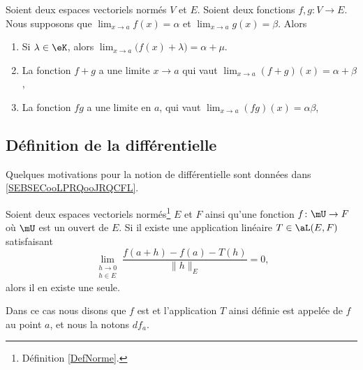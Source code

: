 \begin{proposition}     \label{PROPooBHHCooPbRggh}
	Soient deux espaces vectoriels normés \( V\) et \( E\). Soient deux fonctions \( f,g\colon V\to E\). Nous supposons que \( \lim_{x\to a} f(x)=\alpha\) et \( \lim_{x\to a} g(x)=\beta\). Alors
	\begin{enumerate}
		\item	\label{ITEMooDPBHooKRccPZ}
		      Si \( \lambda\in \eK\), alors \( \lim_{x\to a}\big( f(x)+\lambda \big)=\alpha+\mu\).
		\item   \label{ITEMooDKJPooMynOcG}
		      La fonction \( f+g\) a une limite \( x\to a\) qui vaut \( \lim_{x\to a} (f+g)(x)=\alpha+\beta\),
		\item
		      La fonction \( fg\) a une limite en \( a\), qui vaut \( \lim_{x\to a} (fg)(x)=\alpha\beta\),
	\end{enumerate}
\end{proposition}


\subsection{Définition de la différentielle}

Quelques motivations pour la notion de différentielle sont données dans \ref{SEBSECooLPRQooJRQCFL}.

\begin{propositionDef}      \label{DefDifferentiellePta}
	Soient deux espaces vectoriels normés\footnote{Définition \ref{DefNorme}.} \( E\) et \( F\) ainsi qu'une fonction \( f\colon \mU\to F\) où \( \mU\) est un ouvert de \( E\). Si il existe une application linéaire \( T\in\aL(E,F)\) satisfaisant
	\begin{equation}	\label{EqCritereDefDiff}
		\lim_{\substack{h\to 0\\h\in E}}\frac{f(a+h)-f(a)-T(h)}{\|h\|_E}=0,
	\end{equation}
	alors il en existe une seule.

	Dans ce cas nous disons que \( f\) est  et l'application \( T\) ainsi définie est appelée  de \( f\) au point \( a\), et nous la notons \( df_a\).
\end{propositionDef}

